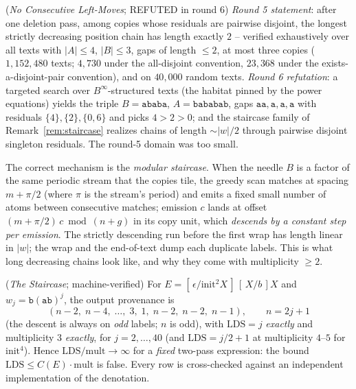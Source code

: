 
\begin{fact}
    (\emph{No Consecutive Left-Moves}; REFUTED in round 6)
    \label{fact:leftmove}
    \emph{Round 5 statement}: after one deletion pass, among copies
    whose residuals are pairwise disjoint, the longest strictly
    decreasing position chain has length exactly $2$ -- verified
    exhaustively over all texts with $|A| \leq 4$, $|B| \leq 3$, gaps
    of length $\leq 2$, at most three copies ($1{,}152{,}480$ texts;
    $4{,}730$ under the all-disjoint convention, $23{,}368$ under the
    exists-a-disjoint-pair convention), and on $40{,}000$ random texts.
    \emph{Round 6 refutation}: a targeted search over
    $B^{\infty}$-structured texts (the habitat pinned by the power
    equations) yields the triple $B = \mathtt{ababa}$, $A =
    \mathtt{bababab}$, gaps $\mathtt{aa},\mathtt{a},\mathtt{a},
    \mathtt{a}$ with residuals $\{4\}, \{2\}, \{0,6\}$ and picks
    $4 > 2 > 0$; and the staircase family of
    Remark~\ref{rem:staircase} realizes chains of length
    $\sim |w|/2$ through pairwise disjoint singleton residuals.  The
    round-5 domain was too small.
\end{fact}

The correct mechanism is the \emph{modular staircase}.  When the
needle $B$ is a factor of the same periodic stream that the copies
tile, the greedy scan matches at spacing $m + \pi/2$ (where $\pi$ is
the stream's period) and emits a fixed small number of atoms between
consecutive matches; emission $c$ lands at offset $(m +
\pi/2)\,c \bmod (n + g)$ in its copy unit, which \emph{descends by a
constant step per emission}.  The strictly descending run before the
first wrap has length linear in $|w|$; the wrap and the end-of-text
dump each duplicate labels.  This is what long decreasing chains look
like, and why they come with multiplicity $\geq 2$.

\begin{remark}
    (\emph{The Staircase}; machine-verified)
    \label{rem:staircase}
    For $E = [\,\epsilon/\mathrm{init}^2 X\,]\,[\,X/b\,]X$ and $w_j =
    \mathtt{b}(\mathtt{ab})^{j}$, the output provenance is
    \[
        (n-2,\; n-4,\; \ldots,\; 3,\; 1,\; n-2,\; n-2,\; n-1),
        \qquad n = 2j+1
    \]
    (the descent is always on \emph{odd} labels; $n$ is odd),
    with $\mathrm{LDS} = j$ \emph{exactly} and multiplicity $3$
    \emph{exactly}, for $j = 2, \ldots, 40$ (and $\mathrm{LDS} =
    j/2 + 1$ at multiplicity $4$--$5$ for $\mathrm{init}^4$).  Hence
    $\mathrm{LDS}/\mathrm{mult} \to \infty$ for a \emph{fixed}
    two-pass expression: the bound
    $\mathrm{LDS} \leq C(E) \cdot \mathrm{mult}$ is false.  Every row
    is cross-checked against an independent implementation of the
    denotation.
\end{remark}

